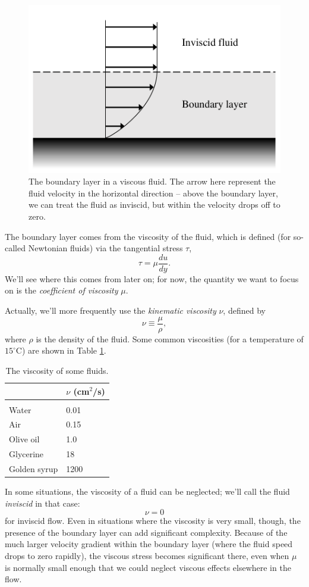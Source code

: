 \begin{figure}
\centering\includegraphics[width=0.7\linewidth]{Figures/Chapter1/fig_boundary_layer}
\caption{The boundary layer in a viscous fluid.  The arrow here represent the fluid velocity in the horizontal direction -- above the boundary layer, we can treat the fluid as inviscid, but within the velocity drops off to zero.}
\label{fig_boundary}
\end{figure}

The boundary layer comes from the viscosity of the fluid, which is defined (for so-called Newtonian fluids) via the tangential stress $\tau$,
\begin{equation}
\label{eq_visc_def}
\tau = \mu \frac{du}{dy}.
\end{equation}
We'll see where this comes from later on; for now, the quantity we want to focus on is the \emph{coefficient of viscosity} $\mu$.

Actually, we'll more frequently use the \emph{kinematic viscosity} $\nu$, defined by
$$
\nu \equiv \frac{\mu}{\rho},
$$
where $\rho$ is the density of the fluid. Some common viscosities (for a temperature of $15^\circ$C) are shown in Table \ref{tab_viscosity}.

\begin{table}[t]
\centering
  \begin{tabular}{l|l}
  & $\nu$ (cm$^2$/s) \\
  \hline \\
  Water & 0.01 \\
  Air & 0.15 \\
  Olive oil & 1.0 \\
  Glycerine & 18 \\
  Golden syrup & 1200
  \end{tabular}
  \caption{The viscosity of some fluids.}
  \label{tab_viscosity}
\end{table}

In some situations, the viscosity of a fluid can be neglected; we'll call the fluid \emph{inviscid} in that case:
\begin{equation}
\boxed{
\nu = 0
}
\end{equation}
for inviscid flow.  Even in situations where the viscosity is very small, though, the presence of the boundary layer can add significant complexity.  Because of the much larger velocity gradient within the boundary layer (where the fluid speed drops to zero  rapidly), the viscous stress becomes significant there, even when $\mu$ is normally small enough that we could neglect viscous effects elsewhere in the flow.

